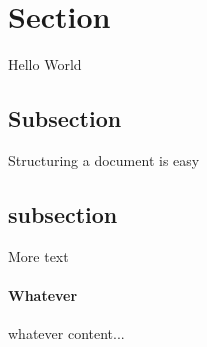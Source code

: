 \documentclass{article}
\begin{document}
	\section{Section}
	Hello World
	\subsection{Subsection}
	Structuring a document is easy
	\subsection{subsection}
	More text
	\paragraph{Whatever}
	whatever
	content...
\end{document}
